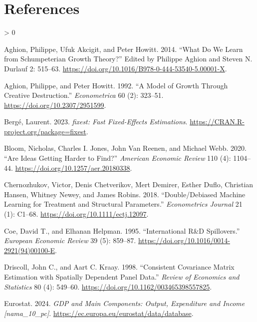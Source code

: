 \documentclass[
  11pt,
]{article}
\newlength{\cslhangindent}
\newenvironment{CSLReferences}[2] %
 {%
  \setlength{\parindent}{0pt}
  \ifodd #1 \everypar{\setlength{\hangindent}{\cslhangindent}}\ignorespaces\fi
  \ifnum #2 > 0
  \setlength{\parskip}{#2\baselineskip}
  \fi
 }%
 {}
\begin{document}
\hypertarget{references}{%
\section*{References}\label{references}}

\hypertarget{refs}{}
\begin{CSLReferences}{1}{0}
\leavevmode{}%
Aghion, Philippe, Ufuk Akcigit, and Peter Howitt. 2014. {``What Do We Learn from {Schumpeterian} Growth Theory?''} Edited by Philippe Aghion and Steven N. Durlauf 2: 515--63. \url{https://doi.org/10.1016/B978-0-444-53540-5.00001-X}.

\leavevmode{}%
Aghion, Philippe, and Peter Howitt. 1992. {``A Model of Growth Through Creative Destruction.''} \emph{Econometrica} 60 (2): 323--51. \url{https://doi.org/10.2307/2951599}.

\leavevmode{}%
Bergé, Laurent. 2023. \emph{{fixest}: Fast Fixed-Effects Estimations}. \url{https://CRAN.R-project.org/package=fixest}.

\leavevmode{}%
Bloom, Nicholas, Charles I. Jones, John Van Reenen, and Michael Webb. 2020. {``Are Ideas Getting Harder to Find?''} \emph{American Economic Review} 110 (4): 1104--44. \url{https://doi.org/10.1257/aer.20180338}.

\leavevmode{}%
Chernozhukov, Victor, Denis Chetverikov, Mert Demirer, Esther Duflo, Christian Hansen, Whitney Newey, and James Robins. 2018. {``Double/Debiased Machine Learning for Treatment and Structural Parameters.''} \emph{Econometrics Journal} 21 (1): C1--68. \url{https://doi.org/10.1111/ectj.12097}.

\leavevmode{}%
Coe, David T., and Elhanan Helpman. 1995. {``International {R\&D} Spillovers.''} \emph{European Economic Review} 39 (5): 859--87. \url{https://doi.org/10.1016/0014-2921(94)00100-E}.

\leavevmode{}%
Driscoll, John C., and Aart C. Kraay. 1998. {``Consistent Covariance Matrix Estimation with Spatially Dependent Panel Data.''} \emph{Review of Economics and Statistics} 80 (4): 549--60. \url{https://doi.org/10.1162/003465398557825}.

\leavevmode{}%
Eurostat. 2024. \emph{{GDP} and Main Components: Output, Expenditure and Income {[}{nama\_10\_pc}{]}}. \url{https://ec.europa.eu/eurostat/data/database}.


\end{CSLReferences}
\end{document}
